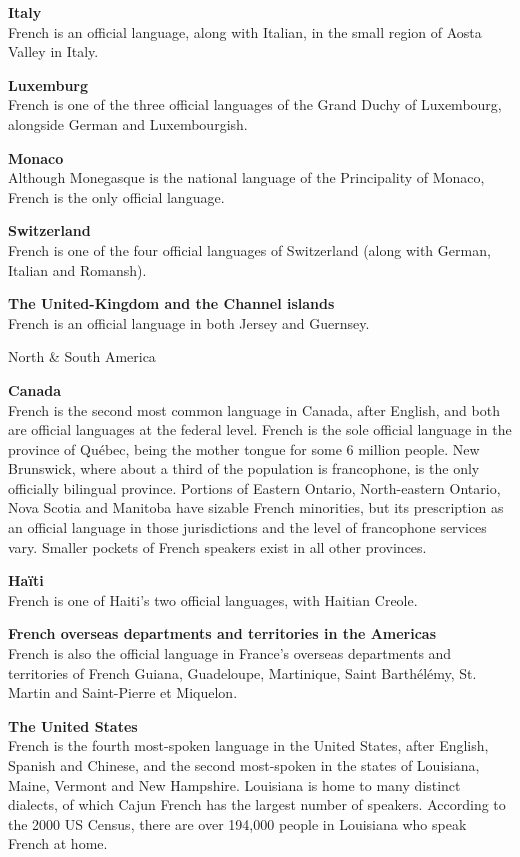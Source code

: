 \begin{multicols}{2}
{\bf Italy}\\
French is an official language, along with Italian, in the small region of Aosta Valley in Italy.

{\bf Luxemburg}\\
French is one of the three official languages of the Grand Duchy of Luxembourg, alongside German and Luxembourgish.

{\bf Monaco}\\ 
Although Monegasque is the national language of the Principality of
Monaco, French is the only official language.

{\bf Switzerland}\\
French is one of the four official languages of Switzerland (along with German, Italian and Romansh).

{\bf The United-Kingdom and the Channel islands}\\
French is an official language in both Jersey and Guernsey.

\begin{center}
{\sc North \& South America}
\end{center}

{\bf Canada}\\
French is the second most common language in Canada, after English,
and both are official languages at the federal level. French is the
sole official language in the province of Québec, being the mother
tongue for some 6 million people. New Brunswick, where about a third
of the population is francophone, is the only officially bilingual
province. Portions of Eastern Ontario, North-eastern Ontario, Nova
Scotia and Manitoba have sizable French minorities, but its
prescription as an official language in those jurisdictions and the
level of francophone services vary. Smaller pockets of French speakers
exist in all other provinces.

{\bf Haïti}\\
French is one of Haiti's two official languages, with Haitian Creole. 

{\bf French overseas departments and territories in the Americas}\\
French is also the official language in France's overseas departments and territories of French Guiana, Guadeloupe, Martinique, Saint Barthélémy, St. Martin and Saint-Pierre et Miquelon.

{\bf The United States }\\
French is the fourth most-spoken language in the United States, after
English, Spanish and Chinese, and the second most-spoken in the states
of Louisiana, Maine, Vermont and New Hampshire. Louisiana is home to
many distinct dialects, of which Cajun French has the largest number
of speakers. According to the 2000 US Census, there are over 194,000
people in Louisiana who speak French at home.


\end{multicols}
